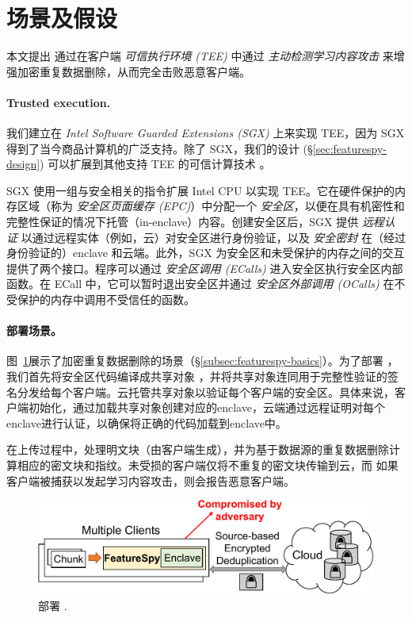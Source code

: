 \section{场景及假设}
\label{sec:featurespy-setting}
本文提出 \sysnameF 通过在客户端 {\em 可信执行环境 (TEE)} 中通过 {\em 主动检测学习内容攻击} 来增强加密重复数据删除，从而完全击败恶意客户端。

\paragraph*{Trusted execution.} 我们建立在 {\em Intel Software Guarded Extensions (SGX)} \cite{sgx} 上来实现 TEE，因为 SGX 得到了当今商品计算机的广泛支持。除了 SGX，我们的设计 (\S\ref{sec:featurespy-design}) 可以扩展到其他支持 TEE 的可信计算技术 \cite{amd-sev, pinto19}。

SGX 使用一组与安全相关的指令扩展 Intel CPU 以实现 TEE。它在硬件保护的内存区域（称为 {\em 安全区页面缓存 (EPC)}）中分配一个 {\em 安全区}，以便在具有机密性和完整性保证的情况下托管（in-enclave）内容。创建安全区后，SGX 提供 {\em 远程认证} 以通过远程实体（例如，云）对安全区进行身份验证，以及 {\em 安全密封} 在（经过身份验证的）enclave 和云端。此外，SGX 为安全区和未受保护的内存之间的交互提供了两个接口。程序可以通过 {\em 安全区调用 (ECalls)} 进入安全区执行安全区内部函数。在 ECall 中，它可以暂时退出安全区并通过 {\em 安全区外部调用 (OCalls)} 在不受保护的内存中调用不受信任的函数。



\paragraph*{部署场景。}图~\ref{fig:featurespy-model}展示了加密重复数据删除的场景（\S\ref{subsec:featurespy-basics}）。为了部署 \sysnameF，我们首先将安全区代码编译成共享对象 \cite{sgx}，并将共享对象连同用于完整性验证的签名分发给每个客户端。云托管共享对象以验证每个客户端的安全区。具体来说，客户端初始化\sysnameF，通过加载共享对象创建对应的enclave，云端通过远程证明\cite{sgx}对每个enclave进行认证，以确保将正确的代码加载到enclave中。

在上传过程中，\sysnameF 处理明文块（由客户端生成），并为基于数据源的重复数据删除计算相应的密文块和指纹。未受损的客户端仅将不重复的密文块传输到云，而 \sysnameF 如果客户端被捕获以发起学习内容攻击，则会报告恶意客户端。

\begin{figure}
  \centering
  \includegraphics[width=\textwidth]{pic/featurespy/deployment.pdf}
  \vspace{-6pt}
  \caption{部署 \sysnameF.}
  \label{fig:featurespy-model}
  \vspace{-6pt}
\end{figure}

